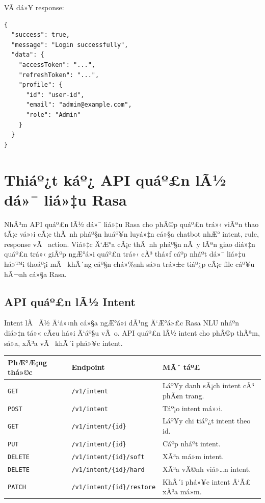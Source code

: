 ﻿\documentclass[12pt,a4paper]{report}
\begin{document}
VÃ­ dá»¥ response:

\begin{verbatim}
{
  "success": true,
  "message": "Login successfully",
  "data": {
    "accessToken": "...",
    "refreshToken": "...",
    "profile": {
      "id": "user-id",
      "email": "admin@example.com",
      "role": "Admin"
    }
  }
}
\end{verbatim}

\section{Thiáº¿t káº¿ API quáº£n lÃ½ dá»¯ liá»‡u Rasa}

NhÃ³m API quáº£n lÃ½ dá»¯ liá»‡u Rasa cho phÃ©p quáº£n trá»‹ viÃªn thao tÃ¡c vá»›i cÃ¡c thÃ nh pháº§n huáº¥n luyá»‡n cá»§a chatbot nhÆ° intent, rule, response vÃ  action. Viá»‡c Ä‘Æ°a cÃ¡c thÃ nh pháº§n nÃ y lÃªn giao diá»‡n quáº£n trá»‹ giÃºp ngÆ°á»i quáº£n trá»‹ cÃ³ thá»ƒ cáº­p nháº­t dá»¯ liá»‡u há»™i thoáº¡i mÃ  khÃ´ng cáº§n chá»‰nh sá»­a trá»±c tiáº¿p cÃ¡c file cáº¥u hÃ¬nh cá»§a Rasa.

\subsection{API quáº£n lÃ½ Intent}

Intent lÃ  Ã½ Ä‘á»‹nh cá»§a ngÆ°á»i dÃ¹ng Ä‘Æ°á»£c Rasa NLU nháº­n diá»‡n tá»« cÃ¢u há»i Ä‘áº§u vÃ o. API quáº£n lÃ½ intent cho phÃ©p thÃªm, sá»­a, xÃ³a vÃ  khÃ´i phá»¥c intent.

\begin{longtable}{|p{3cm}|p{5cm}|p{7cm}|}
\hline
\textbf{PhÆ°Æ¡ng thá»©c} & \textbf{Endpoint} & \textbf{MÃ´ táº£} \\
\hline
\texttt{GET} & \texttt{/v1/intent} & Láº¥y danh sÃ¡ch intent cÃ³ phÃ¢n trang. \\
\hline
\texttt{POST} & \texttt{/v1/intent} & Táº¡o intent má»›i. \\
\hline
\texttt{GET} & \texttt{/v1/intent/\{id\}} & Láº¥y chi tiáº¿t intent theo id. \\
\hline
\texttt{PUT} & \texttt{/v1/intent/\{id\}} & Cáº­p nháº­t intent. \\
\hline
\texttt{DELETE} & \texttt{/v1/intent/\{id\}/soft} & XÃ³a má»m intent. \\
\hline
\texttt{DELETE} & \texttt{/v1/intent/\{id\}/hard} & XÃ³a vÄ©nh viá»…n intent. \\
\hline
\texttt{PATCH} & \texttt{/v1/intent/\{id\}/restore} & KhÃ´i phá»¥c intent Ä‘Ã£ xÃ³a má»m. \\
\hline
\end{longtable}
\end{document}
